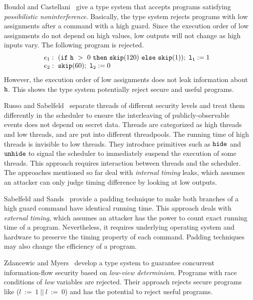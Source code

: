 \documentclass[a4paper]{report}
\newcommand{\co}[1]{$\cod{#1}$}
\begin{document}
Boudol and Castellani~\cite{Castellani:Boudol:TCS02} give a type system that
accepts programs satisfying {\em possibilistic noninterference}.
Basically, the type system rejects programs with low assignments after a command
with a high guard. Since the execution order of
low assignments do not depend on high values, low outputs 
will not change as high inputs vary. The following program
is rejected.
\begin{equation}
 \begin{array}{l}
e_1:~(\ifthenelse{\cod{h}~>~0}{\cod{skip}(120)}{\cod{skip}(1)});~\cod{l_1}:=1 \\ 
e_2:~\cod{skip}(60);~\cod{l_2}:=0
 \end{array}
\label{chap2:example:multithread2}
\end{equation}
However, the execution order of low assignments does not leak information about \co{h}.
This shows the type system potentially reject secure and useful programs.

Russo and Sabelfeld~\cite{Russo:Sabelfeld:CSFW06} separate threads of 
different security levels and treat them differently in the scheduler 
to ensure the interleaving of publicly-observable events does not 
depend on secret data. Threads are categorized as high threads 
and low threads, and are put into different threadpools. The running time 
of high threads is invisible to low threads. They introduce primitives such 
as $\mathtt{hide}$ and $\mathtt{unhide}$ to signal the scheduler 
to immediately suspend the execution of some threads. This
approach requires interaction between threads and the scheduler.
The approaches mentioned so far deal with {\em internal timing} leaks, which
assumes an attacker can only judge timing difference by looking at
low outputs.

Sabelfeld and Sands~\cite{Sabelfeld:Sands:CSFW00} provide a padding
technique to make both branches of a high guard command have identical
running time. This approach deals with {\em external timing}, which 
assumes an attacker has the power to count exact running time of a 
program. Nevertheless, it requires underlying operating system 
and hardware to preserve the timing property of each command. Padding techniques
may also change the efficiency of a program.

Zdancewic and Myers~\cite{Zdancewic:Myers:CSFW03} develop a type system to
guarantee concurrent information-flow security based 
on {\em low-view determinism}.
Programs with race conditions of {\it low} variables are rejected.
Their approach rejects secure programs like ($l~:=~1~||~l~:=~0$) and
has the potential to reject useful programs.
\end{document}
